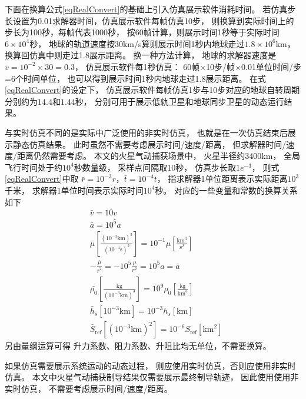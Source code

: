 下面在换算公式\eqref{eqRealConvert}的基础上引入仿真展示软件消耗时间。
若仿真步长设置为0.01求解器时间，仿真展示软件每帧仿真10步，
则换算到实际时间上的步长为100秒，每帧代表1000秒，
按60帧计算，则展示时间1秒等于实际时间$6\times10^4$秒，
地球的轨道速度按30km/s算则展示时间1秒内地球走过$1.8\times10^6$km，
换算回仿真中则走过1.8展示距离。
换一种方法计算，
地球的求解器速度是$\bar{v}=10^{-2}\times30=0.3$，
仿真展示软件每1秒仿真：
60帧$\times$10步/帧$\times$0.01单位时间/步=6个时间单位，
也可以得到展示时间1秒内地球走过1.8展示距离。
在式\eqref{eqRealConvert}的设定下，
仿真展示软件每帧仿真1步与10步对应的地球自转周期分别约为$14.4$和$1.44$秒，
分别可用于展示低轨卫星和地球同步卫星的动态运行结果。

与实时仿真不同的是实际中广泛使用的非实时仿真，
也就是在一次仿真结束后展示静态仿真结果。
此时虽然不需要考虑展示时间/速度/距离，
但求解器时间/速度/距离仍然需要考虑。
本文的火星气动捕获场景中，
火星半径约$3400$km，
全局飞行时间处于约$10^4$秒数量级，
采样点间隔取10秒，
仿真步长取$1e^{-3}$，
则式\eqref{eqRealConvert}中取
$\bar{r}=10^{-3}r$，$\bar{t}=10^{-4}t$，
指求解器1单位距离表示实际距离$10^3$千米，
求解器1单位时间表示实际时间$10^4$秒。
对应的一些变量和常数的换算关系如下
\begin{align*}
    &\bar{v} = 10v \\
    &\bar{a} = 10^5a \\
    &\bar{\mu}\left[\frac{(10^{-3}\text{km})^3}{(10^{-4}\text{s})^2}\right]
     = 10^{-1}\mu\left[\frac{\text{km}^3}{\text{s}^2}\right] \\
    &-\frac{\bar{\mu}}{\bar{r}^2} = -10^5\frac{\mu}{r^2} = 10^5a = \bar{a} \\
    &\bar{\rho_0}\left[\frac{\text{kg}}{(10^{-3}\text{km})^3}\right]
    = 10^9\rho_0\left[\frac{\text{kg}}{\text{km}^3}\right] \\
    &\bar{h}_s[10^{-3}\text{km}] = 10^{-3}h_s[\text{km}] \\
    &\bar{S}_\text{ref}[(10^{-3}\text{km})^2] = 10^{-6}S_\text{ref}[\text{km}^2]
\end{align*}
另由量纲运算可得
升力系数、阻力系数、升阻比均无单位，不需要换算。

如果仿真需要展示系统运动的动态过程，
则应使用实时仿真，否则应使用非实时仿真。
本文中火星气动捕获制导结果仅需要展示最终制导轨迹，
因此使用使用非实时仿真，
不需要考虑展示时间/速度/距离。

